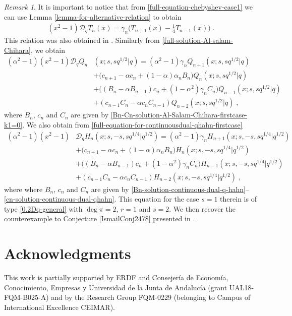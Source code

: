 \documentclass{amsart}
\theoremstyle{remark}
\newtheorem{remark}[theorem]{Remark}
\numberwithin{equation}{section}
\begin{document}
\begin{remark}
It is important to notice that from \eqref{full-equation-chebyshev-case1} we can use Lemma \ref{lemma-for-alternative-relation} to obtain
\begin{align*}
(x^2-1)\mathcal{D}_qT_n(x)=\gamma_n\Big(T_{n+1}(x)-\frac{1}{4}T_{n-1}(x)\Big)\;. 
\end{align*}
This relation was also obtained in \cite{KCDMJP2021c}.
Similarly from \eqref{full-solution-Al-salam-Chihara}, we obtain
\begin{align*}
(\alpha^2-1)(x^2-1)\mathcal{D}_qQ_{n}&(x;s,sq^{1/2}|q)=(\alpha^2-1)\gamma_nQ_{n+1}(x;s,sq^{1/2}|q)\\
&+\big(c_{n+1}-\alpha c_n +(1-\alpha)\alpha_n B_n\big)Q_n(x;s,sq^{1/2}|q)\\
&+\big((B_n-\alpha B_{n-1})c_n +(1-\alpha^2)\gamma_n C_n \big)Q_{n-1}(x;s,sq^{1/2}|q)\\
&+(c_{n-1}C_n-\alpha c_nC_{n-1})Q_{n-2}(x;s,sq^{1/2}|q) \;,
\end{align*}
where $B_n$, $c_n$ and $C_n$ are given by \eqref{Bn-Cn-solution-Al-Salam-Chihara-firstcase-k1=0}. We also obtain from \eqref{full-equation-for-continuousdual-qhahn-firstcase}
\begin{align*}
(\alpha^2-1)(x^2-1)&\mathcal{D}_qH_{n}(x;s,-s,sq^{1/4}|q^{1/2})=(\alpha^2-1)\gamma_nH_{n+1}(x;s,-s,sq^{1/4}|q^{1/2})\\
&+\big(c_{n+1}-\alpha c_n +(1-\alpha)\alpha_n B_n\big)H_n(x;s,-s,sq^{1/4}|q^{1/2})\\
&+\big((B_n-\alpha B_{n-1})c_n +(1-\alpha^2)\gamma_n C_n \big)H_{n-1}(x;s,-s,sq^{1/4}|q^{1/2})\\
&+(c_{n-1}C_n-\alpha c_nC_{n-1})H_{n-2}(x;s,-s,sq^{1/4}|q^{1/2}) \;,
\end{align*}
where where $B_n$, $c_n$ and $C_n$ are given by \eqref{Bn-solution-continuous-dual-q-hahn}--\eqref{cn-solution-continuous-dual-qhahn}. This equation for the case $s=1$ therein is of type \eqref{0.2Dq-general} with $\deg \pi =2$, $r=1$ and $s=2$. We then recover the counterexample to Conjecture \ref{IsmailConj2478} presented in \cite{KCDM2022}. 
\end{remark}


\section*{Acknowledgments}
This work is partially supported by ERDF and Consejer\'ia de Econom\'ia, Conocimiento, Empresas y Universidad de la Junta de Andaluc\'ia (grant UAL18-FQM-B025-A) and by the Research Group FQM-0229 (belonging to Campus of International Excellence CEIMAR).
\end{document}
